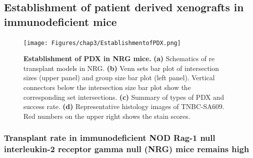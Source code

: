 \subsection{Establishment of patient derived xenografts in immunodeficient mice}


\begin{figure}
	\centering
	\texttt{[image: Figures/chap3/EstablishmentofPDX.png]}
	\caption[Establishment of PDX in NRG mice]
	{\small
	    \textbf{Establishment of PDX in NRG mice.}
	    \textbf{(a)} Schematics of re transplant models in NRG.
	    \textbf{(b)} Venn sets bar plot of intersection sizes (upper panel) and group size bar plot (left panel). Vertical connectors below the intersection size bar plot show the corresponding set intersections.
	    \textbf{(c)} Summary of types of PDX and success rate.
	     \textbf{(d)} Representative histology images of TNBC-SA609. Red numbers on the upper right shows the stain scores.
	}

	\label{fig:EstablishmentofPDX}
\end{figure}

\subsubsection{Transplant rate in immunodeficient NOD Rag-1 null interleukin-2 receptor gamma null (NRG) mice remains high}

